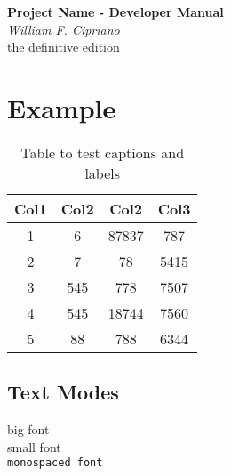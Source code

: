 \documentclass{article}
\newcommand{\monospaced}[1]{\colorbox{light-gray}{\texttt{#1}}}
\begin{document}


\begin{titlepage}
   \begin{center}
      \Large\textbf{Project Name - Developer Manual}\\
      \large\textit{William F. Cipriano}\\
      \tiny{the definitive edition}
   \end{center}
\end{titlepage}



\tableofcontents

\listoftables


\newpage



\section{Example}

\begin{table}[h!]
\centering
\begin{tabular}{||c c c c||} 
 \hline
 Col1 & Col2 & Col2 & Col3 \\ [0.5ex] 
 \hline\hline
 1 & 6 & 87837 & 787 \\ 
 2 & 7 & 78 & 5415 \\
 3 & 545 & 778 & 7507 \\
 4 & 545 & 18744 & 7560 \\
 5 & 88 & 788 & 6344 \\ [1ex] 
 \hline
\end{tabular}
\caption{Table to test captions and labels}
\label{table:1}
\end{table}


\subsection{Text Modes}
\huge big font \\
\small small font \\
\monospaced{monospaced font} \\
\end{document}
